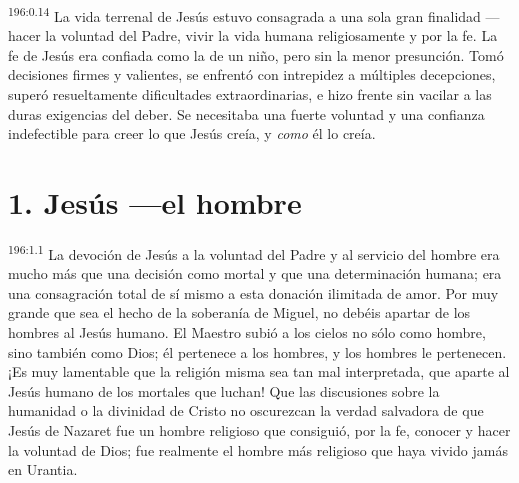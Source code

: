 \par 
\textsuperscript{196:0.14} La vida terrenal de Jesús estuvo consagrada a una sola gran finalidad ---hacer la voluntad del Padre, vivir la vida humana religiosamente y por la fe. La fe de Jesús era confiada como la de un niño, pero sin la menor presunción. Tomó decisiones firmes y valientes, se enfrentó con intrepidez a múltiples decepciones, superó resueltamente dificultades extraordinarias, e hizo frente sin vacilar a las duras exigencias del deber. Se necesitaba una fuerte voluntad y una confianza indefectible para creer lo que Jesús creía, y \textit{como} él lo creía.

\section*{1. Jesús ---el hombre}
\par 
\textsuperscript{196:1.1} La devoción de Jesús a la voluntad del Padre y al servicio del hombre era mucho más que una decisión como mortal y que una determinación humana; era una consagración total de sí mismo a esta donación ilimitada de amor. Por muy grande que sea el hecho de la soberanía de Miguel, no debéis apartar de los hombres al Jesús humano. El Maestro subió a los cielos no sólo como hombre, sino también como Dios; él pertenece a los hombres, y los hombres le pertenecen. ¡Es muy lamentable que la religión misma sea tan mal interpretada, que aparte al Jesús humano de los mortales que luchan! Que las discusiones sobre la humanidad o la divinidad de Cristo no oscurezcan la verdad salvadora de que Jesús de Nazaret fue un hombre religioso que consiguió, por la fe, conocer y hacer la voluntad de Dios; fue realmente el hombre más religioso que haya vivido jamás en Urantia.


